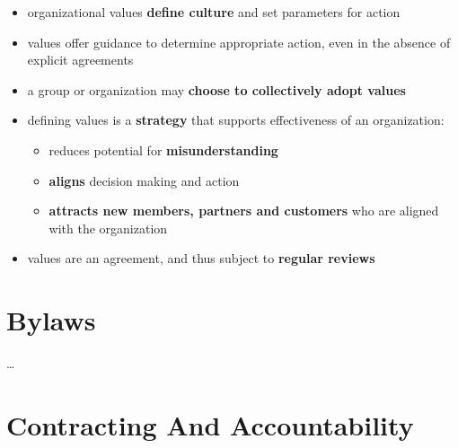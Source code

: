 \begin{itemize}
\item organizational values \textbf{define culture} and set parameters for action

\item values offer guidance to determine appropriate action, even in the absence of explicit agreements

\item a group or organization may \textbf{choose to collectively adopt values}

\item defining values is a \textbf{strategy} that supports effectiveness of an organization:

\begin{itemize}
\item reduces potential for \textbf{misunderstanding}

\item \textbf{aligns} decision making and action

\item \textbf{attracts new members, partners and customers} who are aligned with the organization

\end{itemize}

\item values are an agreement, and thus subject to \textbf{regular reviews}

\end{itemize}

\section{Bylaws}
\label{bylaws}

{\ldots}

\section{Contracting And Accountability}
\label{contractingandaccountability}


